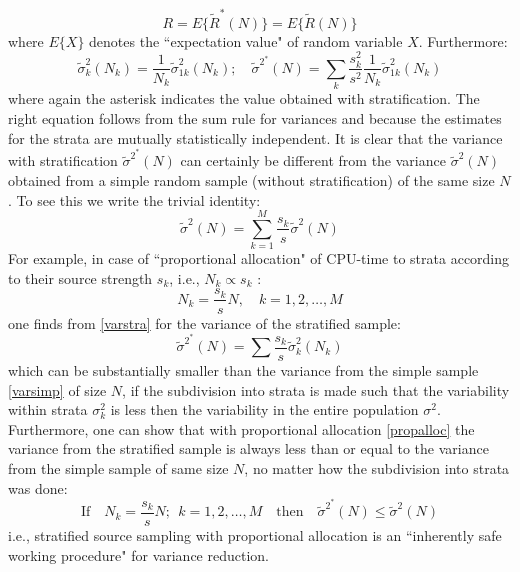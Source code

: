 \begin{equation}
  R = E\{\tilde R^*(N)\} = E\{\tilde R(N)\}
\end{equation}
where $E\{X\}$ denotes
the ``expectation value" of random variable $X$.
Furthermore:
\begin{equation}
  \label{varstra}
  \tilde \sigma^2_{k}
  (N_k) = \frac{1}{N_k}\tilde \sigma^2_{1k}(N_k); \quad \tilde \sigma^{2^*}(N) =
  \sum_k \frac{s_k^2}{s^2}\frac{1}{N_k}\tilde \sigma^2_{1k}(N_k)
\end{equation}
where again the asterisk indicates the value obtained with stratification.
The right equation follows from the sum rule for variances and because the
estimates for the strata are mutually statistically independent.
It is clear that the variance with stratification $\tilde \sigma^{2^*}(N)$ can
certainly be different from the variance $\tilde \sigma^2(N)$ obtained	 from a
simple random sample (without stratification) of the same size $N$.
To see this we write the trivial identity:
\begin{equation}
  \label{varsimp}
  \tilde \sigma^2(N) = \sum_{k=1}^{M}\frac{s_k}{s} \tilde\sigma^2(N)
\end{equation}
For example, in case of ``proportional allocation" of CPU-time to strata
according to their source strength $s_k$, i.e.,  $N_k \propto s_k$ :
\begin{equation}
  \label{propalloc}
  N_k=\frac{s_k}{s} N, \quad k = 1, 2, \dots, M
\end{equation}
one finds from
\cref{varstra} for the variance of the stratified sample:
\begin{equation}
  \tilde \sigma^{2^*}
  (N) = \sum \frac{s_k}{s}\tilde \sigma^2_{k}(N_k)
\end{equation}
which can be
substantially smaller than the variance from the simple sample \cref{varsimp}
of size $N$, if the subdivision into strata is made such that the variability
within strata $\sigma_k^2$ is less then the variability in the entire
population $\sigma^2$.
Furthermore, one can show that with proportional allocation \cref{propalloc}
the variance from the stratified sample is always less than or equal to the
variance from the simple sample of same size $N$, no matter how the subdivision
into strata was done:
\begin{equation}
  \mbox{If} \quad N_k=\frac{s_k}{s}
  N; ~~ k = 1, 2, \dots, M \quad \mbox{then} \quad  \tilde \sigma^{2^*}(N) \leq
  \tilde \sigma^{2}(N)
\end{equation}
i.e., stratified source sampling with
proportional allocation is an ``inherently safe working procedure" for variance
reduction.

